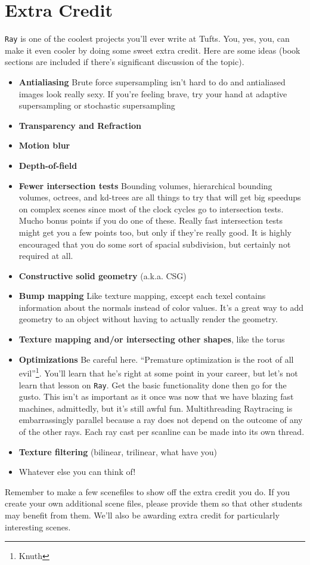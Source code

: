 \documentclass[10pt,twocolumn]{article}
\begin{document}
\section{Extra Credit}
{\tt Ray} is one of the coolest projects you'll ever write at Tufts. You, yes, you, can make it even cooler by doing some sweet extra credit. Here are some ideas (book sections are included if there's significant discussion of the topic).
\begin{itemize}
\item{\bf Antialiasing} Brute force supersampling isn't hard to do and antialiased images look really sexy. If you're feeling brave, try your hand at adaptive supersampling or stochastic supersampling
\item{\bf Transparency and Refraction}
\item{\bf Motion blur}
\item{\bf Depth-of-field}
\item{\bf Fewer intersection tests} Bounding volumes, hierarchical bounding volumes, octrees, and kd-trees are all things to try that will get big speedups on complex scenes since most of the clock cycles go to intersection tests. Mucho bonus points if you do one of these. Really fast intersection tests might get you a few points too, but only if they're really good. It is highly encouraged that you do some sort of spacial subdivision, but certainly not required at all.
\item{\bf Constructive solid geometry} (a.k.a. CSG)
\item{\bf Bump mapping} Like texture mapping, except each texel contains information about the normals instead of color values. It's a great way to add geometry to an object without having to actually render the geometry.
\item{\bf Texture mapping and/or intersecting other shapes}, like the torus
\item{\bf Optimizations} Be careful here. ``Premature optimization is the root of all evil''\footnote{Knuth}. You'll learn that he's right at some point in your career, but let's not learn that lesson on {\tt Ray}. Get the basic functionality done then go for the gusto. This isn't as important as it once was now that we have blazing fast machines, admittedly, but it's still awful fun. Multithreading Raytracing is embarrassingly parallel because a ray does not depend on the outcome of any of the other rays. Each ray cast per scanline can be made into its own thread.
\item{\bf Texture filtering} (bilinear, trilinear, what have you)
\item Whatever else you can think of!
\end{itemize}
Remember to make a few scenefiles to show off the extra credit you do. If you create your own additional scene files, please provide them so that other students may benefit from them. We'll also be awarding extra credit for particularly interesting scenes.
\end{document}
